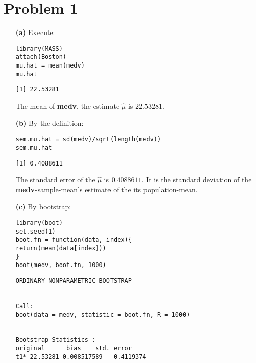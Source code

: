 \documentclass[twoside,11pt]{homework}
\begin{document}
\maketitle

\section*{Problem 1}

\begin{enumerate}
\item[\textbf{(a)}] Execute:

\begin{lstlisting}
library(MASS)
attach(Boston)
mu.hat = mean(medv)
mu.hat
\end{lstlisting}

\begin{verbatim}
[1] 22.53281

\end{verbatim}

The mean of \textbf{medv}, the estimate $\hat{\mu}$ is $22.53281$.

\item[\textbf{(b)}] By the definition:

\begin{lstlisting}
sem.mu.hat = sd(medv)/sqrt(length(medv))
sem.mu.hat
\end{lstlisting}

\begin{verbatim}
[1] 0.4088611

\end{verbatim}

The standard error of the $\hat{\mu}$ is $0.4088611$. It is the standard deviation of the \textbf{medv}-sample-mean's estimate of the its population-mean.

\item[\textbf{(c)}] By bootstrap:

\begin{lstlisting}
library(boot)
set.seed(1)
boot.fn = function(data, index){
return(mean(data[index]))
}
boot(medv, boot.fn, 1000)
\end{lstlisting}

\begin{verbatim}
ORDINARY NONPARAMETRIC BOOTSTRAP


Call:
boot(data = medv, statistic = boot.fn, R = 1000)


Bootstrap Statistics :
original      bias    std. error
t1* 22.53281 0.008517589   0.4119374


\end{verbatim}
\end{enumerate}
\end{document}
